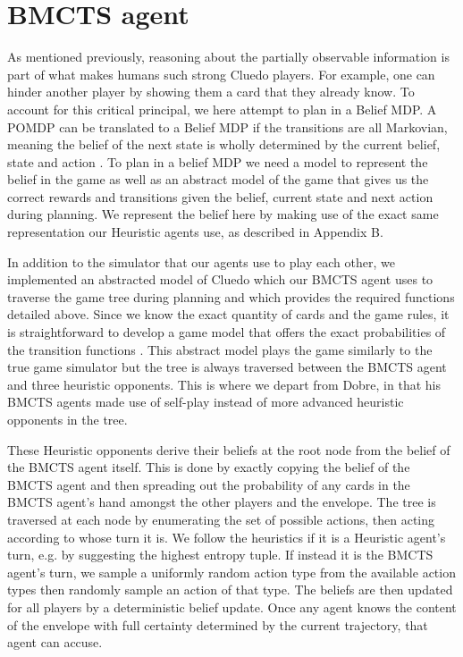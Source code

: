 \documentclass[msc, ai, twoside, notimes, logo, parskip, leftchapter, normalheadings]{infthesis}
\begin{document}
\section{BMCTS agent}
As mentioned previously, reasoning about the partially observable information is part of what makes humans such strong Cluedo players. For example, one can hinder another player by showing them a card that they already know. To account for this critical principal, we here attempt to plan in a Belief MDP. A POMDP can be translated to a Belief MDP if the transitions are all Markovian, meaning the belief of the next state is wholly determined by the current belief, state and action \citep{Mihai}. To plan in a belief MDP we need a model to represent the belief in the game as well as an abstract model of the game that gives us the correct rewards and transitions given the belief, current state and next action during planning. We represent the belief here by making use of the exact same representation our Heuristic agents use, as described in Appendix B. 

In addition to the simulator that our agents use to play each other, we implemented an abstracted model of Cluedo which our BMCTS agent uses to traverse the game tree during planning and which provides the required functions detailed above. Since we know the exact quantity of cards and the game rules, it is straightforward to develop a game model that offers the exact probabilities of the transition functions \citep{Mihai}. This abstract model plays the game similarly to the true game simulator but the tree is always traversed between the BMCTS agent and three heuristic opponents. This is where we depart from Dobre, in that his BMCTS agents made use of self-play instead of more advanced heuristic opponents in the tree. 

These Heuristic opponents derive their beliefs at the root node from the belief of the BMCTS agent itself. This is done by exactly copying the belief of the BMCTS agent and then spreading out the probability of any cards in the BMCTS agent's hand amongst the other players and the envelope. The tree is traversed at each node by enumerating the set of possible actions, then acting according to whose turn it is. We follow the heuristics if it is a Heuristic agent's turn, e.g. by suggesting the highest entropy tuple. If instead it is the BMCTS agent's turn, we sample a uniformly random action type from the available action types then randomly sample an action of that type. The beliefs are then updated for all players by a deterministic belief update. Once any agent knows the content of the envelope with full certainty determined by the current trajectory, that agent can accuse. 
\end{document}

